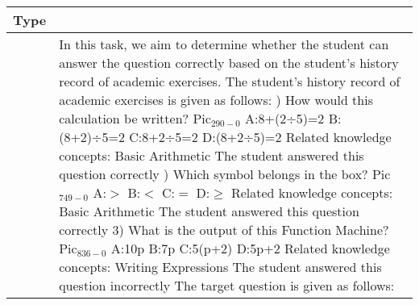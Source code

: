 \begin{table*}[hbt!]
\centering
\small
\begin{tabular}{| >{\centering\arraybackslash}m{} | >{\raggedright\arraybackslash}m{} |}
\hline
\rowcolor{lightgray} %
\textbf{Type} & \multicolumn{1}{c|}{\textbf{Template}} \\
\hline
4 & In this task, we aim to determine whether the student can answer the question correctly based on the student's history record of academic exercises. \newline
    The student's history record of academic exercises is given as follows: \newline
    1) How would this calculation be written? Pic$_{290-0}$ \newline
    A:8+(2÷5)=2 B:(8+2)÷5=2 C:8+2÷5=2 D:(8+2÷5)=2 \newline
    Related knowledge concepts: Basic Arithmetic \newline
    The student answered this question correctly \newline
    2) Which symbol belongs in the box? Pic$_{749-0}$ \newline
    A:$>$  B:$<$  C:$=$ D:$\ge$ \newline
    Related knowledge concepts: Basic Arithmetic \newline
    The student answered this question correctly \newline
    3) What is the output of this Function Machine? Pic$_{836-0}$ \newline
    A:10p B:7p  C:5(p+2)  D:5p+2 \newline
    Related knowledge concepts: Writing Expressions \newline
    The student answered this question incorrectly \newline
    The target question is given as follows: \newline

\end{tabular}
\end{table*}
